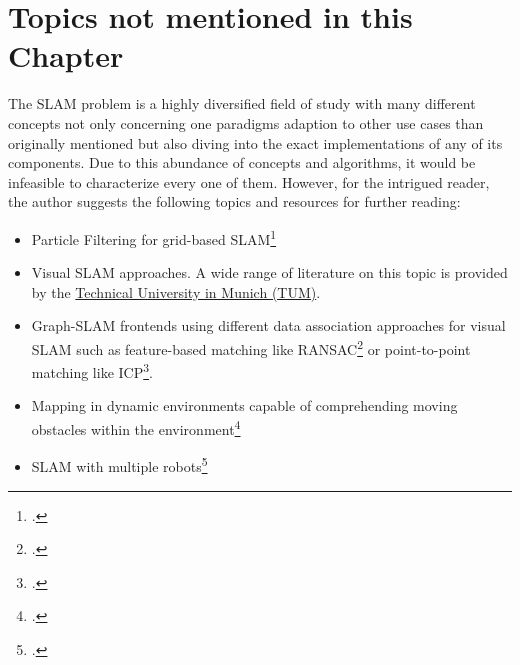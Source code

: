 \section{Topics not mentioned in this Chapter}
The SLAM problem is a highly diversified field of study with many different concepts not only concerning one paradigms adaption to other use cases than originally mentioned but also diving into the exact implementations of any of its components. Due to this abundance of concepts and algorithms, it would be infeasible to characterize every one of them. 
However, for the intrigued reader, the author suggests the following topics and resources for further reading:
\begin{itemize}
	\item Particle Filtering for grid-based SLAM\footcite{grisetti2005ParticleGrid}
	\item Visual SLAM approaches. A wide range of literature on this topic is provided by the \href{https://vision.in.tum.de/research/vslam}{Technical University in Munich (TUM)}.
	\item Graph-SLAM frontends using different data association approaches for visual SLAM such as feature-based matching like RANSAC\footcite{Jia2018FeatureMatching} or point-to-point matching like ICP\footcite{Horn1988ICP}. 
	\item Mapping in dynamic environments capable of comprehending moving obstacles within the environment\footcite{wang2003dynSLAM}
	\item SLAM with multiple robots\footcite{gutmann2003IncrMapping}
\end{itemize} 




\filbreak